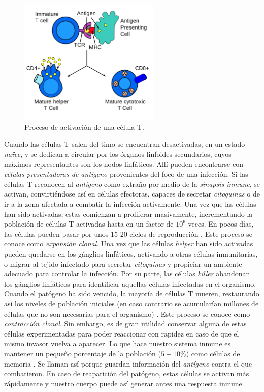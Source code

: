 \begin{figure}[t]
	\centering
	\includegraphics[width=0.6\textwidth]{Imagenes/EstadoDeLaCuestion/Antigen_presentation}
	\caption{Proceso de activación de una célula T.}
	\label{fig:antigen_presentation}
\end{figure}


Cuando las células T salen del timo se encuentran desactivadas, en un estado \textit{naïve}, y se dedican a circular por los órganos linfoides secundarios, cuyos máximos representantes son los nodos linfáticos. Allí pueden encontrarse con \textit{células presentadoras de antígeno} provenientes del foco de una infección. Si las células T reconocen al \textit{antígeno} como extraño por medio de la \textit{sinapsis inmune}, se activan, convirtiéndose así en células efectoras, capaces de secretar \textit{citoquinas} o de ir a la zona afectada a combatir la infección activamente. Una vez que las células han sido activadas, estas comienzan a proliferar masivamente, incrementando la población de células T activadas hasta en un factor de $10^6$ veces. En pocos días, las células pueden pasar por unos 15-20 ciclos de reproducción \citep{JTB}. Este proceso se conoce como \textit{expansión clonal}. Una vez que las células \textit{helper} han sido activadas pueden quedarse en los gánglios linfáticos, activando a otras células inmunitarias, o migrar al tejido infectado para secretar \textit{citoquinas} y propiciar un ambiente adecuado para controlar la infección. Por su parte, las células \textit{killer} abandonan los gánglios linfáticos para identificar aquellas células infectadas en el organismo. Cuando el patógeno ha sido vencido, la mayoría de células T mueren, restaurando así los niveles de población iniciales (en caso contrario se acumularían millones de células que no son necesarias para el organismo) \citep{fernandez2012mecanica}. Este proceso se conoce como \textit{contracción clonal}. Sin embargo, es de gran utilidad conservar alguna de estas células experimentadas para poder reaccionar con rapidez en caso de que el mismo invasor vuelva a aparecer. Lo que hace nuestro sistema inmune es mantener un pequeño porcentaje de la población  ($5-10\%$) como células de memoria \citep{JTB}. Se llaman así porque guardan información del \textit{antígeno} contra el que combatieron. En caso de reaparición del patógeno, estas células se activan más rápidamente y nuestro cuerpo puede así generar antes una respuesta inmune.


